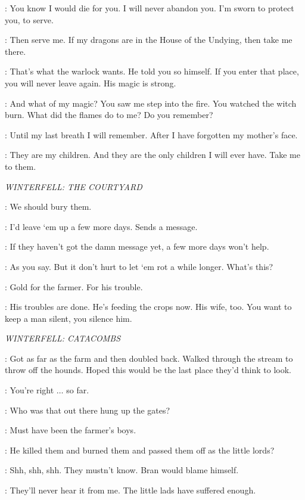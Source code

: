 \JORAH: You know I would die for you. I will never abandon you. I'm sworn to protect you, to serve. 

\DAENERYS: Then serve me. If my dragons are in the House of the Undying, then take me there. 

\JORAH: That's what the warlock wants. He told you so himself. If you enter that place, you will never leave again. His magic is strong. 

\DAENERYS: And what of my magic? You saw me step into the fire. You watched the witch burn. What did the flames do to me? Do you remember? 

\JORAH: Until my last breath I will remember. After I have forgotten my mother's face. 

\DAENERYS: They are my children. And they are the only children I will ever have. Take me to them. 

\scene

\textit{WINTERFELL: THE COURTYARD} 


\THEON: We should bury them. 

\DAGMER: I'd leave `em up a few more days. Sends a message. 

\THEON: If they haven't got the damn message yet, a few more days won't help. 

\DAGMER: As you say. But it don't hurt to let `em rot a while longer. What's this? 

\THEON: Gold for the farmer. For his trouble. 

\DAGMER: His troubles are done. He's feeding the crops now. His wife, too. You want to keep a man silent, you silence him. 



\scene

\textit{WINTERFELL: CATACOMBS} 


\OSHA: Got as far as the farm and then doubled back. Walked through the stream to throw off the hounds. Hoped this would be the last place they'd think to look. 

\LUWIN: You're right $\ldots$ so far. 

\OSHA: Who was that out there hung up the gates? 

\LUWIN: Must have been the farmer's boys. 

\OSHA: He killed them and burned them and passed them off as the little lords? 

\LUWIN: Shh, shh, shh. They mustn't know. Bran would blame himself. 

\OSHA: They'll never hear it from me. The little lads have suffered enough. 


